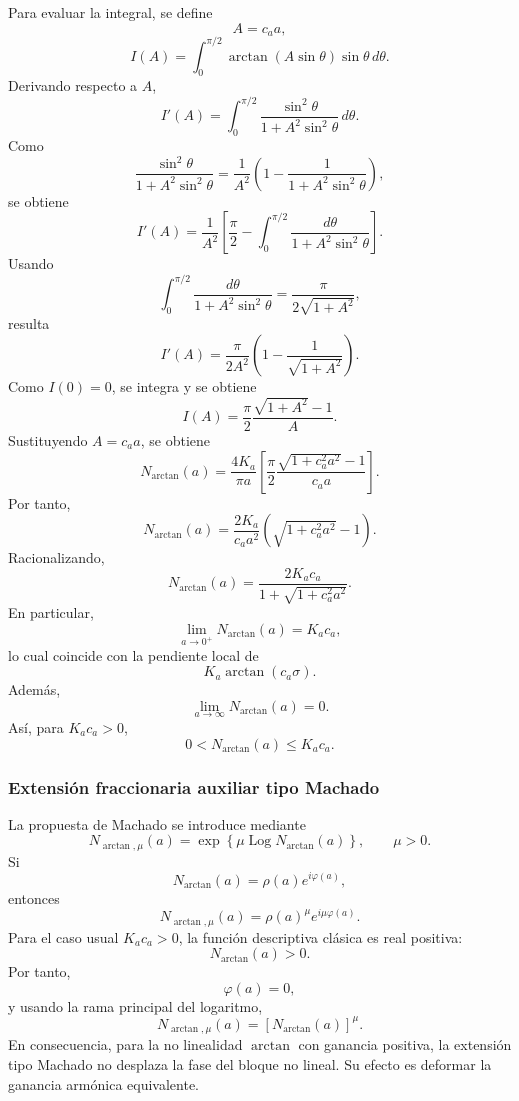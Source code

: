 \documentclass[journal]{IEEEtran}
\begin{document}
Para evaluar la integral, se define
\[
A=c_a a,
\]
\[
I(A)
=
\int_0^{\pi/2}
\arctan(A\sin\theta)\sin\theta\,d\theta.
\]
Derivando respecto a \(A\),
\[
I'(A)
=
\int_0^{\pi/2}
\frac{\sin^2\theta}{1+A^2\sin^2\theta}\,d\theta.
\]
Como
\[
\frac{\sin^2\theta}{1+A^2\sin^2\theta}
=
\frac{1}{A^2}
\left(
1-\frac{1}{1+A^2\sin^2\theta}
\right),
\]
se obtiene
\[
I'(A)
=
\frac{1}{A^2}
\left[
\frac{\pi}{2}
-
\int_0^{\pi/2}
\frac{d\theta}{1+A^2\sin^2\theta}
\right].
\]
Usando
\[
\int_0^{\pi/2}
\frac{d\theta}{1+A^2\sin^2\theta}
=
\frac{\pi}{2\sqrt{1+A^2}},
\]
resulta
\[
I'(A)
=
\frac{\pi}{2A^2}
\left(
1-\frac{1}{\sqrt{1+A^2}}
\right).
\]
Como \(I(0)=0\), se integra y se obtiene
\begin{equation}
\label{eq:I_arctan_alt}
I(A)
=
\frac{\pi}{2}
\frac{\sqrt{1+A^2}-1}{A}.
\end{equation}
Sustituyendo \(A=c_a a\), se obtiene
\[
N_{\arctan}(a)
=
\frac{4K_a}{\pi a}
\left[
\frac{\pi}{2}
\frac{\sqrt{1+c_a^2a^2}-1}{c_a a}
\right].
\]
Por tanto,
\begin{equation}
\label{eq:N_arctan_unsimplified}
N_{\arctan}(a)
=
\frac{2K_a}{c_a a^2}
\left(
\sqrt{1+c_a^2a^2}-1
\right).
\end{equation}
Racionalizando,
\begin{equation}
\label{eq:N_arctan_final}
N_{\arctan}(a)
=
\frac{2K_a c_a}{
1+\sqrt{1+c_a^2a^2}
}.
\end{equation}
En particular,
\[
\lim_{a\to0^+}N_{\arctan}(a)=K_a c_a,
\]
lo cual coincide con la pendiente local de
\[
K_a\arctan(c_a\sigma).
\]
Además,
\[
\lim_{a\to\infty}N_{\arctan}(a)=0.
\]
Así, para \(K_a c_a>0\),
\[
0<N_{\arctan}(a)\le K_a c_a.
\]

\subsubsection{Extensión fraccionaria auxiliar tipo Machado}

La propuesta de Machado se introduce mediante
\begin{equation}
\label{eq:N_arctan_machado}
N_{\arctan,\mu}(a)
=
\exp\left\{
\mu\operatorname{Log}N_{\arctan}(a)
\right\},
\qquad
\mu>0.
\end{equation}
Si
\[
N_{\arctan}(a)=\rho(a)e^{i\varphi(a)},
\]
entonces
\[
N_{\arctan,\mu}(a)
=
\rho(a)^\mu e^{i\mu\varphi(a)}.
\]
Para el caso usual \(K_a c_a>0\), la función descriptiva clásica es real
positiva:
\[
N_{\arctan}(a)>0.
\]
Por tanto,
\[
\varphi(a)=0,
\]
y usando la rama principal del logaritmo,
\begin{equation}
\label{eq:N_arctan_machado_positive}
N_{\arctan,\mu}(a)
=
\left[
N_{\arctan}(a)
\right]^\mu.
\end{equation}
En consecuencia, para la no linealidad \(\arctan\) con ganancia positiva, la
extensión tipo Machado no desplaza la fase del bloque no lineal. Su efecto es
deformar la ganancia armónica equivalente.
\end{document}
